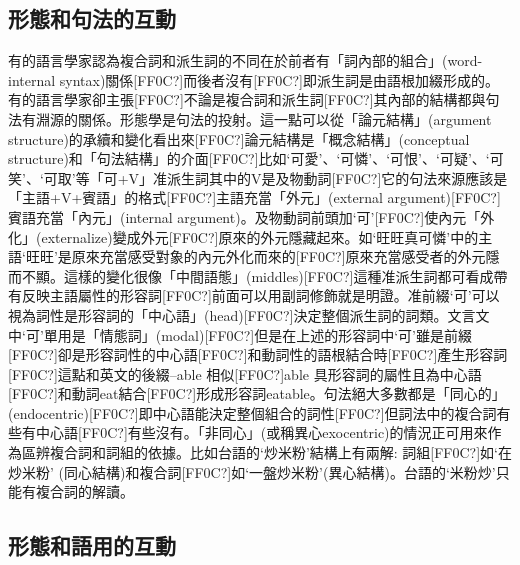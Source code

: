 \subsection{\rmfamily 形態和句法的互動}

\textrm{有的語言學家認為複合詞和派生詞的不同在於前者有「詞內部的組合」(word-internal syntax)關係[FF0C?]而後者沒有[FF0C?]即派生詞是由語根加綴形成的。有的語言學家卻主張[FF0C?]不論是複合詞和派生詞[FF0C?]其內部的結構都與句法有淵源的關係。形態學是句法的投射。這一點可以從「論元結構」(argument structure)的承續和變化看出來[FF0C?]論元結構是「概念結構」(conceptual structure)和「句法結構」的介面[FF0C?]比如‘可愛’}、\textrm{‘可憐’}、\textrm{‘可恨’}、\textrm{‘可疑’}、\textrm{‘可笑’}、\textrm{‘可取’等「可+V」准派生詞其中的V是及物動詞[FF0C?]它的句法來源應該是「主語+V+賓語」的格式[FF0C?]主語充當「外元」(external argument)}[FF0C?]\textrm{賓語充當「內元」(internal argument)}。\textrm{及物動詞前頭加‘可’}[FF0C?]\textrm{使內元「外化」(externalize)變成外元[FF0C?]原來的外元隱藏起來。如‘旺旺真可憐’中的主語‘旺旺’是原來充當感受對象的內元外化而來的[FF0C?]原來充當感受者的外元隱而不顯。這樣的變化很像「中間語態」(middles)}[FF0C?]\textrm{這種准派生詞都可看成帶有反映主語屬性的形容詞[FF0C?]前面可以用副詞修飾就是明證。准前綴‘可’可以視為詞性是形容詞的「中心語」(head)}[FF0C?]\textrm{決定整個派生詞的詞類。文言文中‘可’單用是「情態詞」(modal)}[FF0C?]\textrm{但是在上述的形容詞中‘可’雖是前綴[FF0C?]卻是形容詞性的中心語[FF0C?]和動詞性的語根結合時[FF0C?]產生形容詞[FF0C?]這點和英文的後綴–able 相似[FF0C?]able 具形容詞的屬性且為中心語[FF0C?]和動詞eat結合[FF0C?]形成形容詞eatable}。\textrm{句法絕大多數都是「同心的」(endocentric)}[FF0C?]\textrm{即中心語能決定整個組合的詞性[FF0C?]但詞法中的複合詞有些有中心語[FF0C?]有些沒有。「非同心」(或稱異心exocentric)的情況正可用來作為區辨複合詞和詞組的依據。比如台語的‘炒米粉’結構上有兩解: 詞組[FF0C?]如‘在炒米粉’ (同心結構)和複合詞[FF0C?]如‘一盤炒米粉’(異心結構)}。\textrm{台語的‘米粉炒’只能有複合詞的解讀。}

\subsection{\rmfamily 形態和語用的互動}

